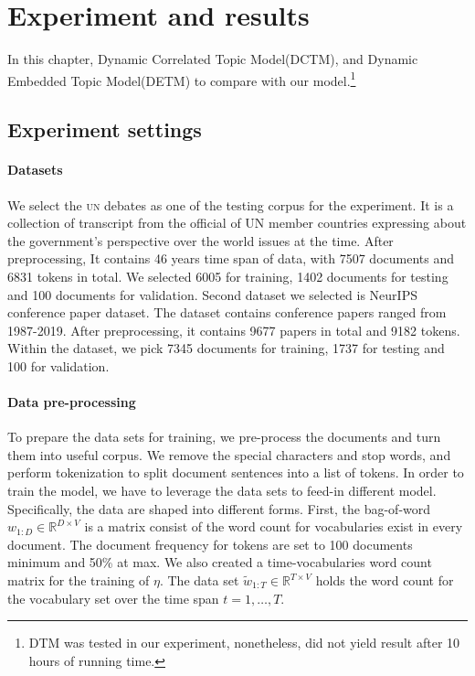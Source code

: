 \section{Experiment and results}
In this chapter, Dynamic Correlated Topic Model(DCTM)\cite{tomasi_stochastic_nodate}, and Dynamic Embedded Topic Model(DETM)\cite{dieng_dynamic_2019} to compare with our model.\footnote{DTM was tested in our experiment, nonetheless, did not yield result after 10 hours of running time.}
\subsection{Experiment settings}
\paragraph{Datasets}
We select the \textsc{un} debates as one of the testing corpus for the experiment. It is a collection of transcript from the official of UN member countries expressing about the  government's perspective over the world issues at the time.
After preprocessing, It contains 46 years time span of data, with 7507 documents and 6831 tokens in total. We selected 6005 for training, 1402 documents for testing and 100 documents for validation.
Second dataset we selected is NeurIPS conference paper dataset. The dataset contains conference papers ranged from 1987-2019. After preprocessing, it contains 9677 papers in total and 9182 tokens. Within the dataset, we pick 7345 documents for training, 1737 for testing and 100 for validation.
\paragraph{Data pre-processing}
To prepare the data sets for training, we pre-process the documents and turn them into useful corpus.
We remove the special characters and stop words, and perform tokenization to split document sentences into a list of tokens. 
In order to train the model, we have to leverage the data sets to feed-in different model. Specifically, the data are shaped into different forms.
First, the bag-of-word $ w_{1:D}\in\mathbb{R}^{D\times V} $ is a matrix consist of the word count for vocabularies exist in every document. The document frequency for tokens are set to 100 documents minimum and 50\% at max.
We also created a time-vocabularies word count matrix for the training of $ \eta $. The data set $ \tilde{w}_{1:T}\in\mathbb{R}^{T\times V} $ holds the word count for the vocabulary set over the time span $ t=1,\dots,T $.
